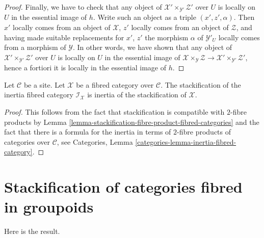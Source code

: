 \begin{proof}
\medskip\noindent
Finally, we have to check that any object of
$\mathcal{X}' \times_{\mathcal{Y}'} \mathcal{Z}'$
over $U$ is locally on $U$ in the essential image of $h$.
Write such an object as a triple $(x', z', \alpha)$.
Then $x'$ locally comes from an object of $\mathcal{X}$,
$z'$ locally comes from an object of $\mathcal{Z}$, and
having made suitable replacements for $x'$, $z'$ the morphism
$\alpha$ of $\mathcal{Y}'_U$ locally comes from a morphism of
$\mathcal{Y}$. In other words, we have shown that any object of
$\mathcal{X}' \times_{\mathcal{Y}'} \mathcal{Z}'$
over $U$ is locally on $U$ in the essential image of
$\mathcal{X} \times_\mathcal{Y} \mathcal{Z} \to
\mathcal{X}' \times_{\mathcal{Y}'} \mathcal{Z}'$, hence
a fortiori it is locally in the essential image of $h$.
\end{proof}

\begin{lemma}
\label{lemma-stackification-inertia}
Let $\mathcal{C}$ be a site.
Let $\mathcal{X}$ be a fibred category over $\mathcal{C}$.
The stackification of the inertia fibred category $\mathcal{I}_\mathcal{X}$
is inertia of the stackification of $\mathcal{X}$.
\end{lemma}

\begin{proof}
This follows from the fact that stackification is compatible
with $2$-fibre products by
Lemma \ref{lemma-stackification-fibre-product-fibred-categories}
and the fact that there is a formula for the inertia in terms of
$2$-fibre products of categories over $\mathcal{C}$, see
Categories, Lemma \ref{categories-lemma-inertia-fibred-category}.
\end{proof}





\section{Stackification of categories fibred in groupoids}
\label{section-stackify-groupoids}

\noindent
Here is the result.

